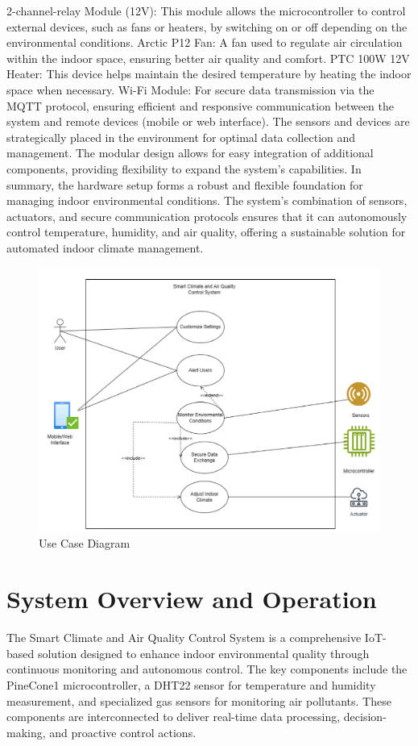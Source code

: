 \documentclass[USenglish,oneside,twocolumn]{article}
\begin{document}
2-channel-relay Module (12V): This module allows the microcontroller to control external devices, such as fans or heaters, by switching on or off depending on the environmental conditions. Arctic P12 Fan: A fan used to regulate air circulation within the indoor space, ensuring better air quality and comfort. PTC 100W 12V Heater: This device helps maintain the desired temperature by heating the indoor space when necessary. Wi-Fi Module: For secure data transmission via the MQTT protocol, ensuring efficient and responsive communication between the system and remote devices (mobile or web interface). The sensors and devices are strategically placed in the environment for optimal data collection and management. The modular design allows for easy integration of additional components, providing flexibility to expand the system's capabilities. In summary, the hardware setup forms a robust and flexible foundation for managing indoor environmental conditions. The system's combination of sensors, actuators, and secure communication protocols ensures that it can autonomously control temperature, humidity, and air quality, offering a sustainable solution for automated indoor climate management.

\begin{figure}[h] 
    \centering
    \includegraphics[width=\columnwidth]{images/UCD.png}
    \caption{Use Case Diagram}
    \label{fig:use_case}
\end{figure}

\section{System Overview and Operation}
The Smart Climate and Air Quality Control System is a comprehensive IoT-based solution designed to enhance indoor environmental quality through continuous monitoring and autonomous control. The key components include the PineCone1 microcontroller, a DHT22 sensor for temperature and humidity measurement, and specialized gas sensors for monitoring air pollutants. These components are interconnected to deliver real-time data processing, decision-making, and proactive control actions.
\end{document}
